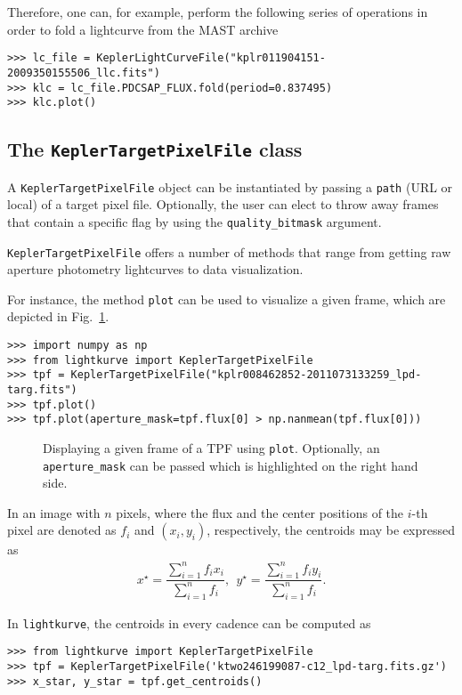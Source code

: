 \documentclass[twocolumn]{aastex62}
\begin{document}
Therefore, one can, for example, perform the following series of operations
in order to fold a lightcurve from the MAST archive
\begin{verbatim}
>>> lc_file = KeplerLightCurveFile("kplr011904151-2009350155506_llc.fits")
>>> klc = lc_file.PDCSAP_FLUX.fold(period=0.837495)
>>> klc.plot()
\end{verbatim}

\subsection{The \texttt{KeplerTargetPixelFile} class}
A \texttt{KeplerTargetPixelFile} object can be instantiated
by passing a \texttt{path} (URL or local) of a target pixel file.
Optionally, the user can elect to throw away frames that contain
a specific flag by using the \texttt{quality\_bitmask} argument.

\texttt{KeplerTargetPixelFile} offers a number of methods
that range from getting raw aperture photometry lightcurves to
data visualization.

For instance, the method \texttt{plot} can be used to visualize a
given frame, which are depicted in Fig.~\ref{fig:plot-method}.

\begin{verbatim}
>>> import numpy as np
>>> from lightkurve import KeplerTargetPixelFile
>>> tpf = KeplerTargetPixelFile("kplr008462852-2011073133259_lpd-targ.fits")
>>> tpf.plot()
>>> tpf.plot(aperture_mask=tpf.flux[0] > np.nanmean(tpf.flux[0]))
\end{verbatim}

\begin{figure}[!htb]
    \centering
    \caption{Displaying a given frame of a TPF using \texttt{plot}.
    Optionally, an \texttt{aperture\_mask} can be passed which is
    highlighted on the right hand side.}
    \label{fig:plot-method}
\end{figure}

In an image with $n$ pixels, where the flux and the center positions of the
$i$-th pixel are denoted as $f_i$ and $(x_i, y_i)$, respectively, the centroids
may be expressed as
\begin{align}
    x^{\star} = \dfrac{\sum_{i=1}^{n} f_i x_i}{\sum_{i=1}^{n}f_i},
    ~~y^{\star} = \dfrac{\sum_{i=1}^{n} f_i y_i}{\sum_{i=1}^{n}f_i}.
\end{align}

In \texttt{lightkurve}, the centroids in every cadence can be computed as
\begin{verbatim}
>>> from lightkurve import KeplerTargetPixelFile
>>> tpf = KeplerTargetPixelFile('ktwo246199087-c12_lpd-targ.fits.gz')
>>> x_star, y_star = tpf.get_centroids()
\end{verbatim}
\end{document}
